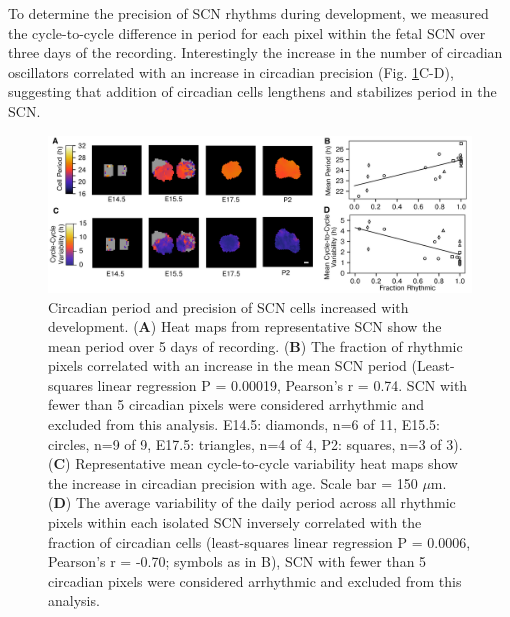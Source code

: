 To determine the precision of SCN rhythms during development, we measured the cycle-to-cycle difference in period for each pixel within the fetal SCN over three days of the recording. Interestingly the increase in the number of circadian oscillators correlated with an increase in circadian precision (Fig. 
\ref{fig:vc3}C-D), suggesting that addition of circadian cells lengthens and stabilizes period in the SCN.

\begin{figure}[p]
    \begin{center}
        \includegraphics[width=6.5in]{chap4/figures/Figure3_vc.png}
    \end{center}
    \caption{\label{fig:vc3} Circadian period and precision of SCN cells increased with development. (\textbf{A}) Heat maps from representative SCN show the mean period over 5 days of recording. (\textbf{B}) The fraction of rhythmic pixels correlated with an increase in the mean SCN period (Least-squares linear regression P = 0.00019, Pearson's r = 0.74. SCN with fewer than 5 circadian pixels were considered arrhythmic and excluded from this analysis.  E14.5: diamonds, n=6 of 11, E15.5: circles, n=9 of 9, E17.5: triangles, n=4 of 4, P2: squares, n=3 of 3).  (\textbf{C}) Representative mean cycle-to-cycle variability heat maps show the increase in circadian precision with age. Scale bar = 150 $\mu$m. (\textbf{D}) The average variability of the daily period across all rhythmic pixels within each isolated SCN inversely correlated with the fraction of circadian cells (least-squares linear regression P = 0.0006, Pearson's r = -0.70; symbols as in B), SCN with fewer than 5 circadian pixels were considered arrhythmic and excluded from this analysis.
    }
\end{figure}

